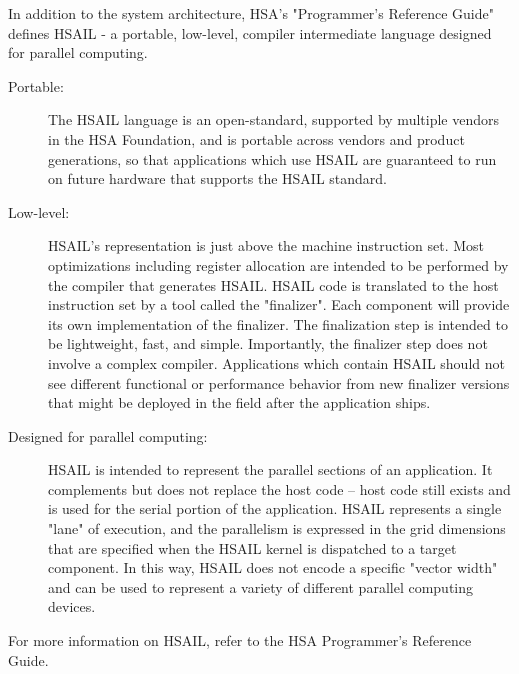 \documentclass[final]{book}
\begin{document}
In addition to the system architecture, HSA's "Programmer's Reference Guide"
defines HSAIL - a portable, low-level, compiler intermediate language designed
for parallel computing.

\begin{description}
\item[Portable:] The HSAIL language is an open-standard, supported by multiple
  vendors in the HSA Foundation, and is portable across vendors and product
  generations, so that applications which use HSAIL are guaranteed to run on
  future hardware that supports the HSAIL standard.
\item[Low-level:] HSAIL's representation is just above the machine instruction
  set. Most optimizations including register allocation are intended to be
  performed by the compiler that generates HSAIL. HSAIL code is translated to
  the host instruction set by a tool called the "finalizer". Each component
  will provide its own implementation of the finalizer. The finalization step
  is intended to be lightweight, fast, and simple. Importantly, the finalizer
  step does not involve a complex compiler. Applications which contain HSAIL
  should not see different functional or performance behavior from new finalizer
  versions that might be deployed in the field after the application ships.
\item[Designed for parallel computing:] HSAIL is intended to represent the
  parallel sections of an application. It complements but does not replace the
  host code – host code still exists and is used for the serial portion of the
  application. HSAIL represents a single "lane" of execution, and the
  parallelism is expressed in the grid dimensions that are specified when the
  HSAIL kernel is dispatched to a target component. In this way, HSAIL does not
  encode a specific "vector width" and can be used to represent a variety of
  different parallel computing devices.
\end{description}

For more information on HSAIL, refer to the HSA Programmer's Reference Guide.
\end{document}
